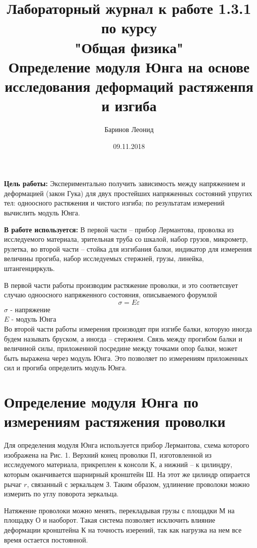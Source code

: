 \documentclass[a4paper,12pt]{article} %
\title{Лабораторный журнал к работе 1.3.1 по курсу \\ "Общая физика"  \\ 
\vspace{0.2cm}
\vspace{4.5cm}
 \LARGE{\textbf{Определение модуля Юнга на основе исследования деформаций растяженпя и изгиба}}\vspace{5.5cm}}
\date{09.11.2018}
\author{\vspace{0.2cm}Баринов Леонид}
\begin{document}
\maketitle
\newpage
\textbf{Цель работы:} Экспериментально получить зависимость между напряжением и деформацией (закон Гука) для двух простейших напряженных состояний упругих тел: одноосного растяжения и чистого изгиба; по результатам измерений вычислить модуль Юнга.

\textbf{В работе используется:} В первой части -- прибор Лермантова, проволка из исследуемого материала, зрительная труба со шкалой, набор грузов, микрометр, рулетка, во второй части -- стойка для изгибания балки, индикатор для измерения величины прогиба, набор исследуемых стержней, грузы, линейка, штангенциркуль.

В первой части работы производим растяжение проволки, и это соответсвует случаю одноосного напряженного состояния, описываемого форумлой 
\[\sigma = E\varepsilon\]
$\sigma$ - напряжение\\
$E$ - модуль Юнга\\
Во второй части работы измерения производят при изгибе балки, которую иногда будем называть бруском, а иногда -- стержнем. Связь между прогибом балки и величиной силы, приложенной посредине между точками опор балки, может быть выражена через модуль Юнга. Это позволяет по измерениям приложенных сил и прогиба определить модуль Юнга.

\section{Определение модуля Юнга по измерениям растяжения проволки}
Для определения модуля Юнга используется прибор Лермантова, схема которого изображена на Рис. 1. Верхний конец проволки П, изготовленной из исследуемого материала, прикреплен к консоли К, а нижний -- к цилиндру, которым оканчивается шарнирный кронштейн Ш. На этот же цилиндр опирается рычаг $r$, связанный с зеркальцем З. Таким образом, удлинение проволоки можно измерить по углу поворота зеркальца.

Натяжение проволоки можно менять, перекладывая грузы с площадки М на площадку О и наоборот. Такая система позволяет исключить влияние деформации кронштейна К на точность изерений, так как нагрузка на нем все время остается постоянной.
\end{document}

